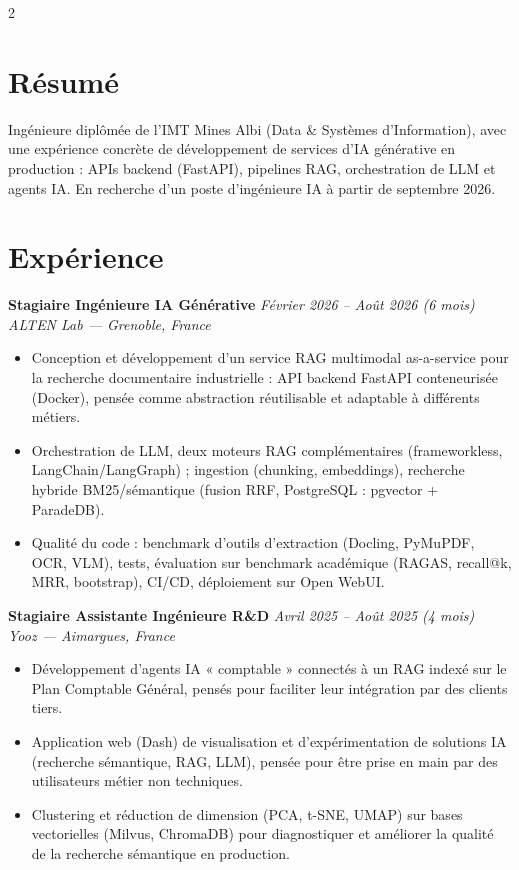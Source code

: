 \documentclass[10.5pt,a4paper]{article}
\newcommand{\sectionrule}{\vspace{-6pt}{\color{accent}\hrule height 1pt}\vspace{2pt}}
\newcommand{\cvexp}[5]{%
  \noindent\textbf{#1} \hfill {\itshape\color{graytext}\small #4}\\
  {\itshape #2 --- #3}\\[-2pt]
  #5
  \vspace{5pt}
}
\begin{document}
\setlength{\columnsep}{1.5em}
\begin{paracol}{2}

\section*{Résumé}
\sectionrule
\justifying
Ingénieure diplômée de l'IMT Mines Albi (Data \& Systèmes d'Information), avec une expérience concrète de développement de services d'IA générative en production : APIs backend (FastAPI), pipelines RAG, orchestration de LLM et agents IA. En recherche d'un poste d'ingénieure IA à partir de septembre 2026.

\section*{Expérience}
\sectionrule

\cvexp{Stagiaire Ingénieure IA Générative}{ALTEN Lab}{Grenoble, France}{Février 2026 -- Août 2026 (6 mois)}{%
  \begin{itemize}[leftmargin=12pt, itemsep=2pt, topsep=0pt, partopsep=0pt, parsep=0pt]
    \item Conception et développement d'un service RAG multimodal as-a-service pour la recherche documentaire industrielle : API backend FastAPI conteneurisée (Docker), pensée comme abstraction réutilisable et adaptable à différents métiers.
    \item Orchestration de LLM, deux moteurs RAG complémentaires (frameworkless, LangChain/\allowbreak LangGraph) ; ingestion (chunking, embeddings), recherche hybride BM25/sémantique (fusion RRF, PostgreSQL : pgvector + ParadeDB).
    \item Qualité du code : benchmark d'outils d'extraction (Docling, PyMuPDF, OCR, VLM), tests, évaluation sur benchmark académique (RAGAS, recall@k, MRR, bootstrap), CI/CD, déploiement sur Open WebUI.
  \end{itemize}
}

\cvexp{Stagiaire Assistante Ingénieure R\&D}{Yooz}{Aimargues, France}{Avril 2025 -- Août 2025 (4 mois)}{%
  \begin{itemize}[leftmargin=12pt, itemsep=2pt, topsep=0pt, partopsep=0pt, parsep=0pt]
    \item Développement d'agents IA « comptable » connectés à un RAG indexé sur le Plan Comptable Général, pensés pour faciliter leur intégration par des clients tiers.
    \item Application web (Dash) de visualisation et d'expérimentation de solutions IA (recherche sémantique, RAG, LLM), pensée pour être prise en main par des utilisateurs métier non techniques.
    \item Clustering et réduction de dimension (PCA, t-SNE, UMAP) sur bases vectorielles (Milvus, ChromaDB) pour diagnostiquer et améliorer la qualité de la recherche sémantique en production.
  \end{itemize}
}


\end{paracol}
\end{document}
